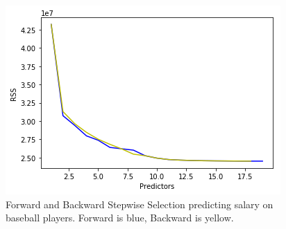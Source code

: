 \begin{figure}[h]
	\centering
	\includegraphics[scale=0.5]{subsetSelection/selectionMethods/fig/forwardBackwardStepwiseSelectionRSS.png}
	\caption{Forward and Backward Stepwise Selection predicting salary on baseball players. Forward is blue, Backward is yellow.}
	\label{fig:forwardBackwardStepwiseSelectionRSS}
\end{figure}

